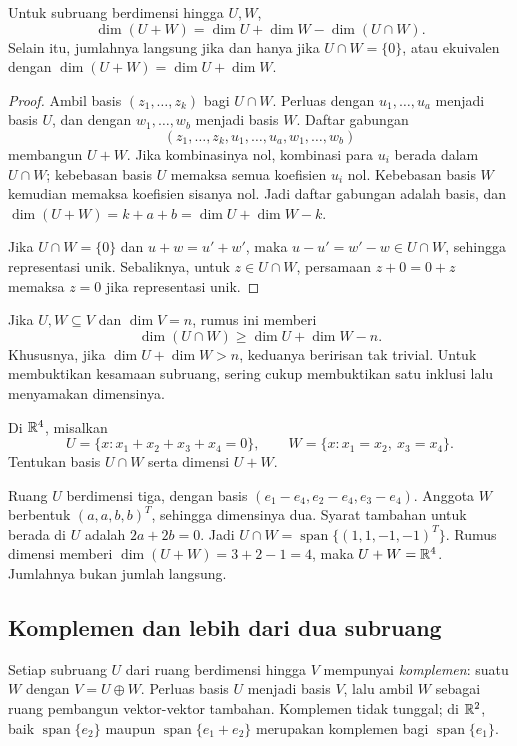 \begin{teorema}
    Untuk subruang berdimensi hingga $U,W$,
    \[
        \dim(U+W)=\dim U+\dim W-\dim(U\cap W).
    \]
    Selain itu, jumlahnya langsung jika dan hanya jika
    $U\cap W=\{0\}$, atau ekuivalen dengan
    $\dim(U+W)=\dim U+\dim W$.
\end{teorema}
\begin{proof}
    Ambil basis $(z_1,\ldots,z_k)$ bagi $U\cap W$.
    Perluas dengan $u_1,\ldots,u_a$ menjadi basis $U$, dan
    dengan $w_1,\ldots,w_b$ menjadi basis $W$.
    Daftar gabungan
    \[
        (z_1,\ldots,z_k,u_1,\ldots,u_a,w_1,\ldots,w_b)
    \]
    membangun $U+W$.
    Jika kombinasinya nol, kombinasi para $u_i$ berada dalam
    $U\cap W$; kebebasan basis $U$ memaksa semua koefisien
    $u_i$ nol. Kebebasan basis $W$ kemudian memaksa koefisien
    sisanya nol. Jadi daftar gabungan adalah basis, dan
    $\dim(U+W)=k+a+b=\dim U+\dim W-k$.

    Jika $U\cap W=\{0\}$ dan $u+w=u'+w'$, maka
    $u-u'=w'-w\in U\cap W$, sehingga representasi unik.
    Sebaliknya, untuk $z\in U\cap W$, persamaan
    $z+0=0+z$ memaksa $z=0$ jika representasi unik.
\end{proof}

Jika $U,W\subseteq V$ dan $\dim V=n$, rumus ini memberi
\[
    \dim(U\cap W)\ge\dim U+\dim W-n.
\]
Khususnya, jika $\dim U+\dim W>n$, keduanya beririsan tak trivial.
Untuk membuktikan kesamaan subruang, sering cukup membuktikan
satu inklusi lalu menyamakan dimensinya.

\begin{exam}
    Di $\mathbb{R}^4$, misalkan
    \[
        U=\{x:x_1+x_2+x_3+x_4=0\},\qquad
        W=\{x:x_1=x_2,\ x_3=x_4\}.
    \]
    Tentukan basis $U\cap W$ serta dimensi $U+W$.
\end{exam}
\begin{solution}
    Ruang $U$ berdimensi tiga, dengan basis
    $(e_1-e_4,e_2-e_4,e_3-e_4)$.
    Anggota $W$ berbentuk $(a,a,b,b)^T$, sehingga dimensinya dua.
    Syarat tambahan untuk berada di $U$ adalah $2a+2b=0$.
    Jadi $U\cap W=\operatorname{span}\{(1,1,-1,-1)^T\}$.
    Rumus dimensi memberi $\dim(U+W)=3+2-1=4$, maka $U+W=\mathbb{R}^4$.
    Jumlahnya bukan jumlah langsung.
\end{solution}

\subsection{Komplemen dan lebih dari dua subruang}
Setiap subruang $U$ dari ruang berdimensi hingga $V$ mempunyai
\emph{komplemen}: suatu $W$ dengan $V=U\oplus W$.
Perluas basis $U$ menjadi basis $V$, lalu ambil $W$ sebagai
ruang pembangun vektor-vektor tambahan. Komplemen tidak tunggal;
di $\mathbb{R}^2$, baik $\operatorname{span}\{e_2\}$ maupun
$\operatorname{span}\{e_1+e_2\}$ merupakan komplemen bagi
$\operatorname{span}\{e_1\}$.

